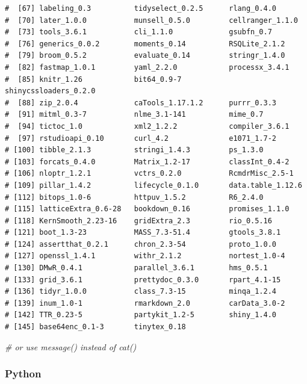 \documentclass[
  12pt,
]{article}
\newenvironment{Shaded}{\begin{snugshade}}{\end{snugshade}}
\newcommand{\CommentTok}[1]{\textcolor[rgb]{0.56,0.35,0.01}{\textit{#1}}}
\begin{document}
\begin{verbatim}
#  [67] labeling_0.3          tidyselect_0.2.5      rlang_0.4.0           
#  [70] later_1.0.0           munsell_0.5.0         cellranger_1.1.0      
#  [73] tools_3.6.1           cli_1.1.0             gsubfn_0.7            
#  [76] generics_0.0.2        moments_0.14          RSQLite_2.1.2         
#  [79] broom_0.5.2           evaluate_0.14         stringr_1.4.0         
#  [82] fastmap_1.0.1         yaml_2.2.0            processx_3.4.1        
#  [85] knitr_1.26            bit64_0.9-7           shinycssloaders_0.2.0 
#  [88] zip_2.0.4             caTools_1.17.1.2      purrr_0.3.3           
#  [91] mitml_0.3-7           nlme_3.1-141          mime_0.7              
#  [94] tictoc_1.0            xml2_1.2.2            compiler_3.6.1        
#  [97] rstudioapi_0.10       curl_4.2              e1071_1.7-2           
# [100] tibble_2.1.3          stringi_1.4.3         ps_1.3.0              
# [103] forcats_0.4.0         Matrix_1.2-17         classInt_0.4-2        
# [106] nloptr_1.2.1          vctrs_0.2.0           RcmdrMisc_2.5-1       
# [109] pillar_1.4.2          lifecycle_0.1.0       data.table_1.12.6     
# [112] bitops_1.0-6          httpuv_1.5.2          R6_2.4.0              
# [115] latticeExtra_0.6-28   bookdown_0.16         promises_1.1.0        
# [118] KernSmooth_2.23-16    gridExtra_2.3         rio_0.5.16            
# [121] boot_1.3-23           MASS_7.3-51.4         gtools_3.8.1          
# [124] assertthat_0.2.1      chron_2.3-54          proto_1.0.0           
# [127] openssl_1.4.1         withr_2.1.2           nortest_1.0-4         
# [130] DMwR_0.4.1            parallel_3.6.1        hms_0.5.1             
# [133] grid_3.6.1            prettydoc_0.3.0       rpart_4.1-15          
# [136] tidyr_1.0.0           class_7.3-15          minqa_1.2.4           
# [139] inum_1.0-1            rmarkdown_2.0         carData_3.0-2         
# [142] TTR_0.23-5            partykit_1.2-5        shiny_1.4.0           
# [145] base64enc_0.1-3       tinytex_0.18          
\end{verbatim}

\begin{Shaded}
\begin{Highlighting}[]
  \CommentTok{# or use message() instead of cat()}
\end{Highlighting}
\end{Shaded}

\hypertarget{python-1}{%
\subsubsection{Python}\label{python-1}}
\end{document}
